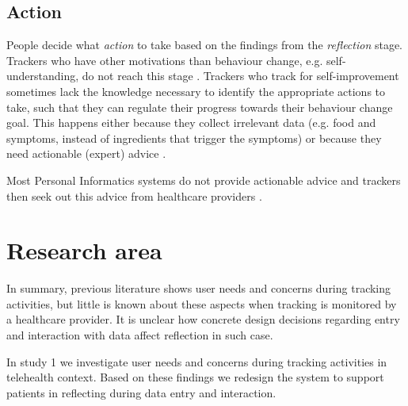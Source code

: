 \subsection{Action}

People decide what \textit{action} to take based on the findings from the \textit{reflection} stage. Trackers who have other motivations than behaviour change, e.g. self-understanding, do not reach this stage \cite{Epstein2015}. Trackers who track for self-improvement sometimes lack the knowledge necessary to identify the appropriate actions to take, such that they can regulate their progress towards their behaviour change goal. This happens either because they collect irrelevant data \cite{Choe2014, Chung2015} (e.g. food and symptoms, instead of ingredients that trigger the symptoms) or because they need actionable (expert) advice \cite{Verdezoto2015, Li2010, Oh2015}. 

Most Personal Informatics systems do not provide actionable advice \cite{Chung2015, Li2010, Verdezoto2015} and trackers then seek out this advice from healthcare providers \cite{Li2010}. 

\section{Research area}

In summary, previous literature shows user needs and concerns during tracking activities, but little is known about these aspects when tracking is monitored by a healthcare provider. It is unclear how concrete design decisions regarding entry and interaction with data affect reflection in such case. 

In study 1 we investigate user needs and concerns during tracking activities in telehealth context. Based on these findings we redesign the system to support patients in reflecting during data entry and interaction. 

